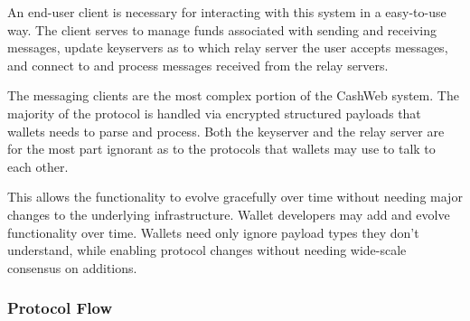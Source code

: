 \documentclass{article}
\begin{document}
An end-user client is necessary for interacting with this system in a easy-to-use way. The client serves to manage funds associated with sending and receiving messages, update keyservers as to which relay server the user accepts messages, and connect to and process messages received from the relay servers.

The messaging clients are the most complex portion of the CashWeb system. The majority of the protocol is handled via encrypted structured payloads that wallets needs to parse and process. Both the keyserver and the relay server are for the most part ignorant as to the protocols that wallets may use to talk to each other.

This allows the functionality to evolve gracefully over time without needing major changes to the underlying infrastructure. Wallet developers may add and evolve functionality over time. Wallets need only ignore payload types they don't understand, while enabling protocol changes without needing wide-scale consensus on additions.

\subsubsection{Protocol Flow}


\end{document}
